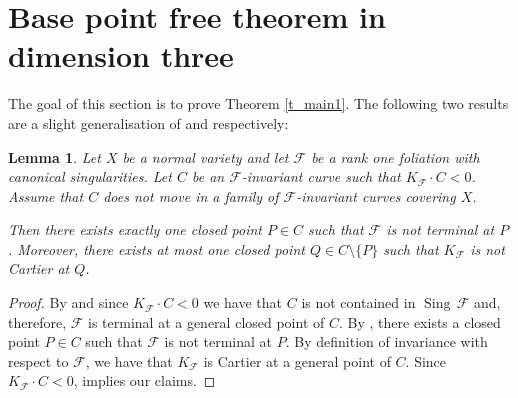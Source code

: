 \documentclass[12pt]{amsart}
\newtheorem{lemma}[theorem]{Lemma}
\newcommand{\sing}[1]{\operatorname{Sing} \, #1}
\newcommand{\cal}[1]{\mathcal{#1}}
\begin{document}
\section{Base point free theorem in dimension three}

The goal of this section is to prove Theorem \ref{t_main1}. 
The following two results are a slight generalisation of \cite[Lemma 5.7]{CS20} and \cite[Lemma 5.15]{CS20} respectively: 

\begin{lemma}\label{l_sing}
Let $X$ be a  normal variety and let $\cal F$ be a rank one foliation with canonical singularities. 
Let $C$ be an $\cal F$-invariant curve such that $K_{\cal F}\cdot C<0$. Assume that  $C$ does not move in a family of $\cal F$-invariant curves covering $X$. 



Then there exists exactly one closed point $P\in C$ such that  $\mathcal F$ is not
terminal at $P$. Moreover, there exists at most one closed point $Q\in C\setminus \{P\}$ such that $K_{\cal F}$ is not Cartier at $Q$. 
\end{lemma}

\begin{proof}
By \cite[\S 4.1]{bm16} and since $K_{\cal F}\cdot C<0$ we have  that $C$ is not contained in $\sing \cal F$ and, therefore, $\cal F$ is terminal at a general closed point of $C$. 
By \cite[Proposition 3.3]{CS20}, there exists a closed point $P\in C$ such that $\cal F$ is not terminal at $P$. By definition of invariance with respect to $\cal F$, we have  that $K_{\cal F}$ is Cartier at a general point of $C$. Since $K_{\cal F}\cdot C<0$,  \cite[Proposition 2.13]{CS20} implies our claims. 
\end{proof}
\end{document}
